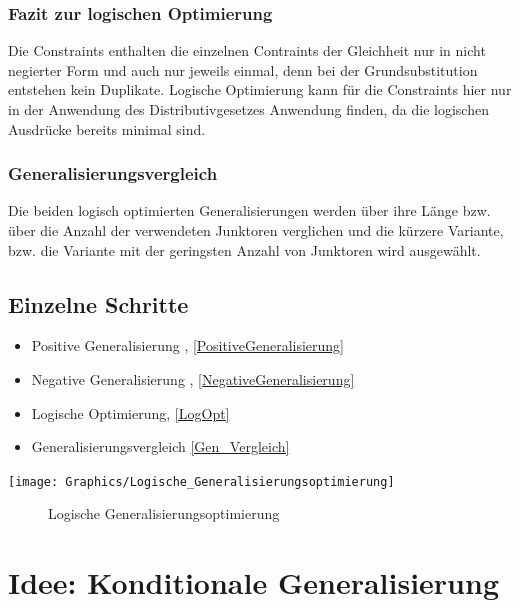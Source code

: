 \documentclass[a4paper, 11pt]{book}
\begin{document}
{		\subsubsection{\large{ Fazit zur logischen Optimierung}}
		 Die Constraints enthalten die einzelnen Contraints der Gleichheit nur in nicht negierter Form und auch nur jeweils einmal, denn bei der Grundsubstitution entstehen kein Duplikate. 
		 Logische Optimierung kann für die Constraints hier nur in der Anwendung des Distributivgesetzes Anwendung finden, da die logischen Ausdrücke bereits minimal sind.	
		 \subsubsection{Generalisierungsvergleich}  \label{Gen_Vergleich}
		 Die beiden logisch optimierten Generalisierungen werden über ihre Länge bzw. über die Anzahl der verwendeten Junktoren verglichen und die kürzere Variante, bzw. die Variante mit der geringsten Anzahl von Junktoren wird ausgewählt.
}
\subsection{Einzelne Schritte}
\begin{itemize}
	\item Positive Generalisierung , \ref{PositiveGeneralisierung}
	\item Negative Generalisierung , \ref{NegativeGeneralisierung}
	\item Logische Optimierung, \ref{LogOpt}
	\item Generalisierungsvergleich \ref{Gen_Vergleich}
\end{itemize}


\texttt{[image: Graphics/Logische\_Generalisierungsoptimierung]}
\begin{figure}[h]
	\caption{Logische Generalisierungsoptimierung }
	\label{Abb_Log_Gen}
\end{figure}



\section{Idee: Konditionale Generalisierung}
\end{document}
